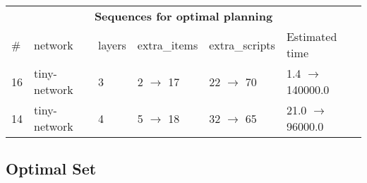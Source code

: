 \documentclass{article}
\begin{document}
                            \begin{center}
                            \begin{tabular}{@{}l|l|l|l|l|l@{}}
                            \multicolumn{6}{c}{\bf \large Sequences for optimal planning}\\
                            \# & network & layers & extra\_items & extra\_scripts & Estimated time\\\midrule
                            16&tiny-network&3&2 $\rightarrow$ 17&22 $\rightarrow$ 70&1.4 $\rightarrow$ 140000.0\\
14&tiny-network&4&5 $\rightarrow$ 18&32 $\rightarrow$ 65&21.0 $\rightarrow$ 96000.0
                            \end{tabular}
                            \end{center}
                    
                                \subsection*{Optimal Set}
                                
\end{document}
